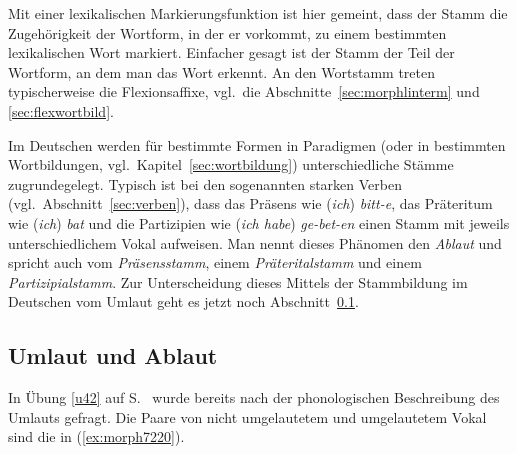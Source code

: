 

Mit einer lexikalischen Markierungsfunktion ist hier gemeint, dass der Stamm die Zugehörigkeit der Wortform, in der er vorkommt, zu einem bestimmten lexikalischen Wort markiert.
Einfacher gesagt ist der Stamm der Teil der Wortform, an dem man das Wort erkennt.
An den Wortstamm treten typischerweise die Flexionsaffixe, vgl.\ die Abschnitte~\ref{sec:morphlinterm} und \ref{sec:flexwortbild}.

Im Deutschen werden für bestimmte Formen in Paradigmen (oder in bestimmten Wortbildungen, vgl.\ Kapitel~\ref{sec:wortbildung}) unterschiedliche Stämme zugrundegelegt.
Typisch ist \zB bei den sogenannten starken Verben (vgl.\ Abschnitt~\ref{sec:verben}), dass das Präsens wie (\textit{ich}) \textit{bitt-e}, das Präteritum wie (\textit{ich}) \textit{bat} und die Partizipien wie (\textit{ich habe}) \textit{ge-bet-en} einen Stamm mit jeweils unterschiedlichem Vokal aufweisen.
Man nennt dieses Phänomen den \textit{Ablaut} und spricht auch vom \textit{Präsensstamm}, einem \textit{Präteritalstamm} und einem \textit{Partizipialstamm}.
Zur Unterscheidung dieses Mittels der Stammbildung im Deutschen vom Umlaut geht es jetzt noch Abschnitt~\ref{sec:umablaut}.

\subsection{Umlaut und Ablaut}

\label{sec:umablaut}

In Übung \ref{u42} auf S.~\pageref{u42} wurde bereits nach der phonologischen Beschreibung des Umlauts gefragt.
Die Paare von nicht umgelautetem und umgelautetem Vokal sind die in (\ref{ex:morph7220}).

\begin{exe}
  \ex\label{ex:morph7220}
  \begin{xlist}
  \end{xlist}
\end{exe}

